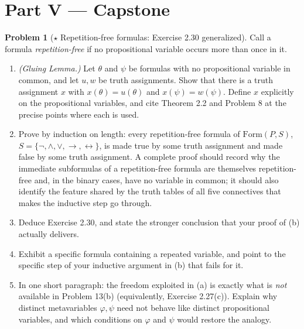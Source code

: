 \documentclass[11pt]{article}
\newcommand{\Form}{\mathrm{Form}}
\newcommand{\Sfive}{\{\lnot,\land,\lor,\to,\leftrightarrow\}}
\theoremstyle{definition}
\newtheorem{problem}{Problem}
\begin{document}
\section*{Part V --- Capstone}

\begin{problem}[$\star$ Repetition-free formulas: Exercise 2.30 generalized]
Call a formula \emph{repetition-free} if no propositional variable occurs more
than once in it.
\begin{enumerate}
\item[(a)] \emph{(Gluing Lemma.)} Let $\theta$ and $\psi$ be formulas with no
propositional variable in common, and let $u,w$ be truth assignments. Show that
there is a truth assignment $x$ with $x(\theta)=u(\theta)$ and
$x(\psi)=w(\psi)$. Define $x$ explicitly on the propositional variables, and cite
Theorem 2.2 and Problem 8 at the precise points where each is used.
\item[(b)] Prove by induction on length: every repetition-free formula of
$\Form(P,S)$, $S=\Sfive$, is made true by some truth assignment and made false by
some truth assignment. A complete proof should record why the immediate
subformulas of a repetition-free formula are themselves repetition-free and, in
the binary cases, have no variable in common; it should also identify the feature
shared by the truth tables of all five connectives that makes the inductive step
go through.
\item[(c)] Deduce Exercise 2.30, and state the stronger conclusion that your proof
of (b) actually delivers.
\item[(d)] Exhibit a specific formula containing a repeated variable, and point to
the specific step of your inductive argument in (b) that fails for it.
\item[(e)] In one short paragraph: the freedom exploited in (a) is exactly what is
\emph{not} available in Problem 13(b) (equivalently, Exercise 2.27(c)). Explain
why distinct metavariables $\varphi,\psi$ need not behave like distinct
propositional variables, and which conditions on $\varphi$ and $\psi$ would
restore the analogy.
\end{enumerate}
\end{problem}
\end{document}
